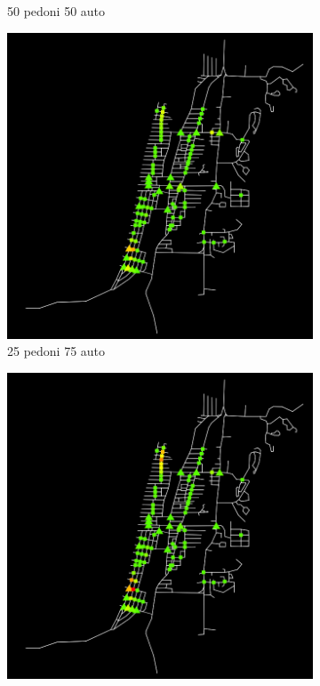 \begin{figure}[ht]
\begin{subfigure}{0.45\textwidth}
        \caption{50 pedoni 50 auto}
    \end{subfigure}
    \hfill
    \begin{subfigure}{0.45\textwidth}
        \centering
        \includegraphics[width=\textwidth]{images/analisi/comparison-car-delay-25-75.png}
        \caption{25 pedoni 75 auto}
    \end{subfigure}
    \begin{subfigure}{0.45\textwidth}
        \centering
        \includegraphics[width=\textwidth]{images/analisi/comparison-car-delay-0-100.png}

\end{subfigure}
\end{figure}
